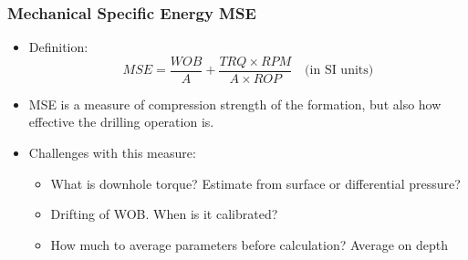 \documentclass{beamer}
\begin{document}
\begin{frame}
\begin{columns}[onlytextwidth]
\begin{column}{0.6\textwidth}

\end{column}
\end{columns}

\end{frame}




\begin{frame} \frametitle{Mechanical Specific Energy MSE} 
\vspace{-1cm}

\begin{itemize}
\item<1-> Definition:
\begin{equation*}
MSE = \frac{WOB}{A} + \frac{TRQ \times RPM}{A \times ROP} \quad \mbox{(in SI units)}
\end{equation*}
\item<1-> MSE is a measure of compression strength of the formation, but also how effective the drilling operation is.

\item<2-> Challenges with this measure:
\begin{itemize}
\item<2-> What is downhole torque? Estimate from surface or differential pressure?
\item<2-> Drifting of WOB. When is it calibrated?
\item<2-> How much to average parameters before calculation? Average on depth
\end{itemize}

\end{itemize}

\end{frame}
\end{document}

